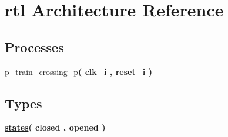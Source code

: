 \hypertarget{classtrain__crossing_1_1rtl}{}\section{rtl Architecture Reference}
\label{classtrain__crossing_1_1rtl}
\subsection*{Processes}
 \begin{DoxyCompactItemize}
\item 
\mbox{\label{classtrain__crossing_1_1rtl_aedd4284072848a951f82e3e2ca316b8b}} 
\hyperlink{classtrain__crossing_1_1rtl_aedd4284072848a951f82e3e2ca316b8b}{p\+\_\+train\+\_\+crossing\+\_\+p}{\bfseries  ( {\bfseries \textcolor{vhdlchar}{clk\+\_\+i}\textcolor{vhdlchar}{ }} , {\bfseries \textcolor{vhdlchar}{reset\+\_\+i}\textcolor{vhdlchar}{ }} )}
\end{DoxyCompactItemize}
\subsection*{Types}
 \begin{DoxyCompactItemize}
\item 
\mbox{\label{classtrain__crossing_1_1rtl_a9cfd00cfdb26259a02135e083f6c2da9}} 
{\bfseries \hyperlink{classtrain__crossing_1_1rtl_a9cfd00cfdb26259a02135e083f6c2da9}{states}{\bfseries \textcolor{vhdlchar}{(}\textcolor{vhdlchar}{ }\textcolor{vhdlchar}{closed}\textcolor{vhdlchar}{ }\textcolor{vhdlchar}{,}\textcolor{vhdlchar}{ }\textcolor{vhdlchar}{opened}\textcolor{vhdlchar}{ }\textcolor{vhdlchar}{)}\textcolor{vhdlchar}{ }}} 
\end{DoxyCompactItemize}
